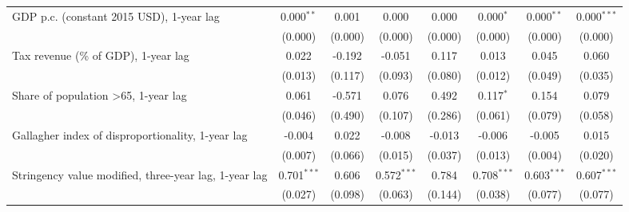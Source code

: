 \begin{table}[htbp]
\begin{tabular}{lccccccc}
      GDP p.c. (constant 2015 USD), 1-year lag                                                  & 0.000$^{**}$  & 0.001                     & 0.000          & 0.000            & 0.000$^{*}$     & 0.000$^{**}$    & 0.000$^{***}$\\   
                                                                                                & (0.000)       & (0.000)                   & (0.000)        & (0.000)          & (0.000)         & (0.000)         & (0.000)\\   
      Tax revenue (\% of GDP), 1-year lag                                                       & 0.022         & -0.192                    & -0.051         & 0.117            & 0.013           & 0.045           & 0.060\\   
                                                                                                & (0.013)       & (0.117)                   & (0.093)        & (0.080)          & (0.012)         & (0.049)         & (0.035)\\   
      Share of population >65, 1-year lag                                                       & 0.061         & -0.571                    & 0.076          & 0.492            & 0.117$^{*}$     & 0.154           & 0.079\\   
                                                                                                & (0.046)       & (0.490)                   & (0.107)        & (0.286)          & (0.061)         & (0.079)         & (0.058)\\   
      Gallagher index of disproportionality, 1-year lag                                         & -0.004        & 0.022                     & -0.008         & -0.013           & -0.006          & -0.005          & 0.015\\   
                                                                                                & (0.007)       & (0.066)                   & (0.015)        & (0.037)          & (0.013)         & (0.004)         & (0.020)\\   
      Stringency value modified, three-year lag, 1-year lag                                     & 0.701$^{***}$ & 0.606                     & 0.572$^{***}$  & 0.784            & 0.708$^{***}$   & 0.603$^{***}$   & 0.607$^{***}$\\   
                                                                                                & (0.027)       & (0.098)                   & (0.063)        & (0.144)          & (0.038)         & (0.077)         & (0.077)\\   

\end{tabular}
\end{table}
